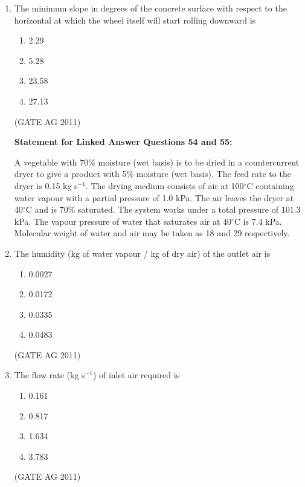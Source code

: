 \documentclass[journal,12pt,onecolumn]{IEEEtran}
\theoremstyle{remark}
\begin{document}
\begin{enumerate}
\item The minimum slope in degrees of the concrete surface with respect to the horizontal at which the wheel itself will start rolling downward is
\begin{multicols}{4}
\begin{enumerate}
    \item 2.29
    \item 5.28
    \item 23.58
    \item 27.13
\end{enumerate}
\end{multicols}
\hfill{(GATE AG 2011)}

\textbf{Statement for Linked Answer Questions 54 and 55:}

A vegetable with 70\% moisture (wet basis) is to be dried in a countercurrent dryer to give a product with 5\% moisture (wet basis). 
The feed rate to the dryer is 0.15 kg s$^{-1}$. 
The drying medium consists of air at 100$^{\circ}$C containing water vapour with a partial pressure of 1.0 kPa. 
The air leaves the dryer at 40$^{\circ}$C and is 70\% saturated. 
The system works under a total pressure of 101.3 kPa. 
The vapour pressure of water that saturates air at 40$^{\circ}$C is 7.4 kPa. 
Molecular weight of water and air may be taken as 18 and 29 respectively.



\item The humidity (kg of water vapour / kg of dry air) of the outlet air is
\begin{multicols}{4}
\begin{enumerate}
    \item 0.0027
    \item 0.0172
    \item 0.0335
    \item 0.0483
\end{enumerate}
\end{multicols}
\hfill{(GATE AG 2011)}



\item The flow rate (kg s$^{-1}$) of inlet air required is
\begin{multicols}{4}
\begin{enumerate}
    \item 0.161
    \item 0.817
    \item 1.634
    \item 3.783
\end{enumerate}
\end{multicols}
\hfill{(GATE AG 2011)}



\end{enumerate}
\end{document}
